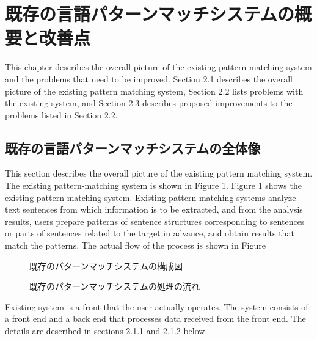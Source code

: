 
\section{既存の言語パターンマッチシステムの概要と改善点}




This chapter describes the overall picture of the existing pattern matching system and the problems that need to be improved. Section 2.1 describes the overall picture of the existing pattern matching system, Section 2.2 lists problems with the existing system, and Section 2.3 describes proposed improvements to the problems listed in Section 2.2.


\subsection{既存の言語パターンマッチシステムの全体像}


This section describes the overall picture of the existing pattern matching system. The existing pattern-matching system is shown in Figure 1.
Figure 1 shows the existing pattern matching system.
Existing pattern matching systems analyze text sentences from which information is to be extracted, and from the analysis results, users prepare patterns of sentence structures corresponding to sentences or parts of sentences related to the target in advance, and obtain results that match the patterns. The actual flow of the process is shown in Figure%
\begin{figure}[htbp]
\centering
\caption{既存のパターンマッチシステムの構成図}
\label{figure:1}
\end{figure}
\begin{figure}[htbp]
\centering
\caption{既存のパターンマッチシステムの処理の流れ}
\label{figure:2}
\end{figure}
Existing system is a front that the user actually operates. The system consists of a front end and a back end that processes data received from the front end.
The details are described in sections 2.1.1 and 2.1.2 below.

